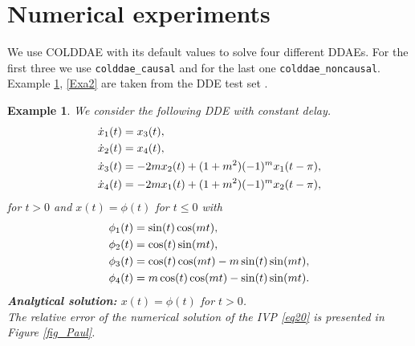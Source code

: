 \documentclass[final,reqno]{siamltex}
\newtheorem{example}[theorem]{Example}
\begin{document}
\section{Numerical experiments}
We use COLDDAE with its default values to solve four different DDAEs. For the first three we use {\tt colddae\_causal} and for the last one {\tt colddae\_noncausal}.
Example \ref{Exa1}, \ref{Exa2} are taken from the DDE test set \cite{Pau94}.
%
\begin{example}\label{Exa1} We consider the following DDE with constant delay.
%
\bsq\label{eq20}
\begin{equation}\label{eq20a}
\bsp{
\dot{x}_1(t) & = x_3(t),\\
\dot{x}_2(t) & = x_4(t),\\
\dot{x}_3(t) & = -2mx_2(t)+(1+m^2)(-1)^mx_1(t-\pi),\\
\dot{x}_4(t) & = -2mx_1(t)+(1+m^2)(-1)^mx_2(t-\pi),
}
\end{equation}
for $t>0$ and $x(t)=\phi(t)$ for $t\leq 0$ with 
\begin{equation}\label{eq20b}
\bsp{
{\phi}_1(t) & = \sin(t)\cos(mt),\\
{\phi}_2(t) & = \cos(t)\sin(mt),\\
{\phi}_3(t) & = \cos(t)\cos(mt)-m\sin(t)\sin(mt),\\
{\phi}_4(t) & =m\cos(t)\cos(mt)-\sin(t)\sin(mt).
}
\end{equation}
\esq
%
{\bf Analytical solution:} \quad $x(t)=\phi(t)$ for $t>0$.\\
The relative error of the numerical solution of the IVP \eqref{eq20} is presented in Figure \ref{fig_Paul}.
\end{example}
%
\end{document}
